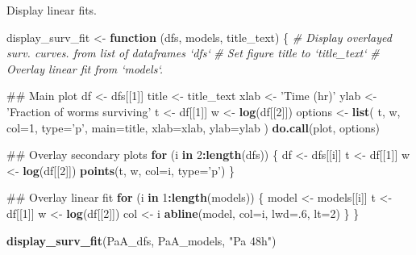 \documentclass[]{article}
\newenvironment{Shaded}{\begin{snugshade}}{\end{snugshade}}
\newcommand{\KeywordTok}[1]{\textcolor[rgb]{0.13,0.29,0.53}{\textbf{#1}}}
\newcommand{\DataTypeTok}[1]{\textcolor[rgb]{0.13,0.29,0.53}{#1}}
\newcommand{\DecValTok}[1]{\textcolor[rgb]{0.00,0.00,0.81}{#1}}
\newcommand{\StringTok}[1]{\textcolor[rgb]{0.31,0.60,0.02}{#1}}
\newcommand{\CommentTok}[1]{\textcolor[rgb]{0.56,0.35,0.01}{\textit{#1}}}
\newcommand{\ControlFlowTok}[1]{\textcolor[rgb]{0.13,0.29,0.53}{\textbf{#1}}}
\newcommand{\OperatorTok}[1]{\textcolor[rgb]{0.81,0.36,0.00}{\textbf{#1}}}
\newcommand{\NormalTok}[1]{#1}
\begin{document}
Display linear fits.

\begin{Shaded}
\begin{Highlighting}[]
\NormalTok{display_surv_fit <-}\StringTok{ }\ControlFlowTok{function}\NormalTok{ (dfs, models, title_text) \{}
  \CommentTok{# Display overlayed surv. curves. from list of dataframes `dfs`}
  \CommentTok{# Set figure title to `title_text`}
  \CommentTok{# Overlay linear fit from `models`.}
  
\NormalTok{  ## Main plot}
\NormalTok{  df <-}\StringTok{ }\NormalTok{dfs[[}\DecValTok{1}\NormalTok{]]}
\NormalTok{  title <-}\StringTok{ }\NormalTok{title_text}
\NormalTok{  xlab <-}\StringTok{ 'Time (hr)'}
\NormalTok{  ylab <-}\StringTok{ 'Fraction of worms surviving'}
\NormalTok{  t <-}\StringTok{ }\NormalTok{df[[}\DecValTok{1}\NormalTok{]]}
\NormalTok{  w <-}\StringTok{ }\KeywordTok{log}\NormalTok{(df[[}\DecValTok{2}\NormalTok{]])}
\NormalTok{  options <-}\StringTok{ }\KeywordTok{list}\NormalTok{(}
\NormalTok{    t, w, }\DataTypeTok{col=}\DecValTok{1}\NormalTok{, }\DataTypeTok{type=}\StringTok{'p'}\NormalTok{, }\DataTypeTok{main=}\NormalTok{title, }\DataTypeTok{xlab=}\NormalTok{xlab, }\DataTypeTok{ylab=}\NormalTok{ylab}
\NormalTok{    )}
  \KeywordTok{do.call}\NormalTok{(plot, options)}
  
\NormalTok{  ## Overlay secondary plots}
  \ControlFlowTok{for}\NormalTok{ (i }\ControlFlowTok{in} \DecValTok{2}\OperatorTok{:}\KeywordTok{length}\NormalTok{(dfs)) \{}
\NormalTok{    df <-}\StringTok{ }\NormalTok{dfs[[i]]}
\NormalTok{      t <-}\StringTok{ }\NormalTok{df[[}\DecValTok{1}\NormalTok{]]}
\NormalTok{    w <-}\StringTok{ }\KeywordTok{log}\NormalTok{(df[[}\DecValTok{2}\NormalTok{]])}
    \KeywordTok{points}\NormalTok{(t, w, }\DataTypeTok{col=}\NormalTok{i, }\DataTypeTok{type=}\StringTok{'p'}\NormalTok{)}
\NormalTok{  \}}
  
\NormalTok{  ## Overlay linear fit}
  \ControlFlowTok{for}\NormalTok{ (i }\ControlFlowTok{in} \DecValTok{1}\OperatorTok{:}\KeywordTok{length}\NormalTok{(models)) \{}
\NormalTok{    model <-}\StringTok{ }\NormalTok{models[[i]]}
\NormalTok{    t <-}\StringTok{ }\NormalTok{df[[}\DecValTok{1}\NormalTok{]]}
\NormalTok{    w <-}\StringTok{ }\KeywordTok{log}\NormalTok{(df[[}\DecValTok{2}\NormalTok{]])}
\NormalTok{    col <-}\StringTok{ }\NormalTok{i}
    \KeywordTok{abline}\NormalTok{(model, }\DataTypeTok{col=}\NormalTok{i, }\DataTypeTok{lwd=}\NormalTok{.}\DecValTok{6}\NormalTok{, }\DataTypeTok{lt=}\DecValTok{2}\NormalTok{)}
\NormalTok{  \}}
\NormalTok{\}}

\KeywordTok{display_surv_fit}\NormalTok{(PaA_dfs, PaA_models, }\StringTok{"Pa 48h"}\NormalTok{)}
\end{Highlighting}
\end{Shaded}
\end{document}
